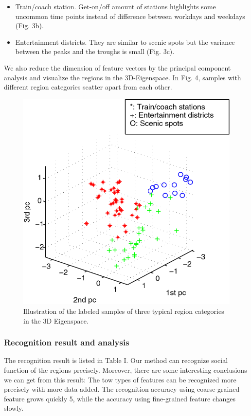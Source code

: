 \documentclass[a4paper, 10pt, conference]{ieeeconf}      %
\begin{document}
\begin{itemize}

\item Train/coach station. Get-on/off amount of stations highlights some uncommon time points instead of difference between workdays and weekdays (Fig. 3b).
\item Entertainment districts. They are similar to scenic spots but the variance between the peaks and the troughs is small (Fig. 3c).

\end{itemize}

We also reduce the dimension of feature vectors by the principal component analysis and visualize the regions in the 3D-Eigenspace. In Fig. 4, samples with different region categories scatter apart from each other.

\begin{figure}[thbp]
    \centering
    \includegraphics{fig/f6.png}
    \caption{Illustration of the labeled samples of three typical region categories in the 3D Eigenspace.}
    \label{fig:my_label_4}
\end{figure}


\subsubsection{ Recognition result and analysis}The recognition result is listed in Table I. Our method can recognize social function of the regions precisely. Moreover, there are some interesting conclusions we can get from this result: The tow types of features can be recognized more precisely with more data added. The recognition accuracy using coarse-grained feature grows quickly 5, while the accuracy using fine-grained feature changes slowly.
\end{document}

